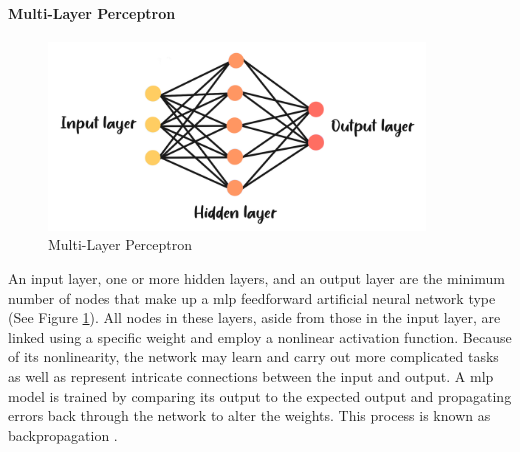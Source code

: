 \paragraph{Multi-Layer Perceptron}
\begin{figure}[H]
    \centering
    \includegraphics[width=10cm]{Images/mlp.png}
    \caption{Multi-Layer Perceptron}
    \label{fig:mlp}
\end{figure}
An input layer, one or more hidden layers, and an output layer are the minimum number of nodes that make up a \gls{mlp} feedforward artificial neural network type (See Figure \ref{fig:mlp}).
All nodes in these layers, aside from those in the input layer, are linked using a specific weight and employ a nonlinear activation function.
Because of its nonlinearity, the network may learn and carry out more complicated tasks as well as represent intricate connections between the input and output.
A \gls{mlp} model is trained by comparing its output to the expected output and propagating errors back through the network to alter the weights. 
This process is known as backpropagation \citep{haykin_2014_neural}.


